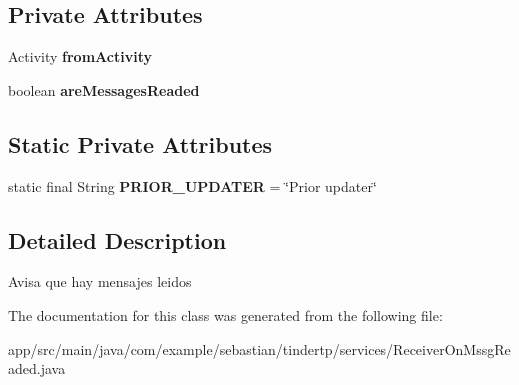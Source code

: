 \subsection*{Private Attributes}
\begin{DoxyCompactItemize}
\item 
Activity {\bfseries from\+Activity}\hypertarget{classcom_1_1example_1_1sebastian_1_1tindertp_1_1services_1_1ReceiverOnMssgReaded_a87bd0c7bd5de05ec1e3e869e0824f01a}{}\label{classcom_1_1example_1_1sebastian_1_1tindertp_1_1services_1_1ReceiverOnMssgReaded_a87bd0c7bd5de05ec1e3e869e0824f01a}

\item 
boolean {\bfseries are\+Messages\+Readed}\hypertarget{classcom_1_1example_1_1sebastian_1_1tindertp_1_1services_1_1ReceiverOnMssgReaded_a7fb038fd1204a888b6642e7d0b451770}{}\label{classcom_1_1example_1_1sebastian_1_1tindertp_1_1services_1_1ReceiverOnMssgReaded_a7fb038fd1204a888b6642e7d0b451770}

\end{DoxyCompactItemize}
\subsection*{Static Private Attributes}
\begin{DoxyCompactItemize}
\item 
static final String {\bfseries P\+R\+I\+O\+R\+\_\+\+U\+P\+D\+A\+T\+ER} = \char`\"{}Prior updater\char`\"{}\hypertarget{classcom_1_1example_1_1sebastian_1_1tindertp_1_1services_1_1ReceiverOnMssgReaded_a1e752012e332558b5be79271b3ee82ea}{}\label{classcom_1_1example_1_1sebastian_1_1tindertp_1_1services_1_1ReceiverOnMssgReaded_a1e752012e332558b5be79271b3ee82ea}

\end{DoxyCompactItemize}


\subsection{Detailed Description}
Avisa que hay mensajes leidos 

The documentation for this class was generated from the following file\+:\begin{DoxyCompactItemize}
\item 
app/src/main/java/com/example/sebastian/tindertp/services/Receiver\+On\+Mssg\+Readed.\+java\end{DoxyCompactItemize}

